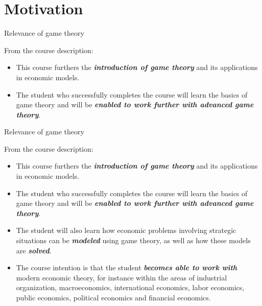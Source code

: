 \section{Motivation}

\begin{frame}{Relevance of game theory}
\begin{multicols}{2}
From the course description:
\begin{itemize}
  \item[1.] This course furthers the \textit{\textbf{introduction of game theory}} and its applications in economic models.
  \item[2.] The student who successfully completes the course will learn the basics of game theory and will be \textit{\textbf{enabled to work further with advanced game theory}}.
\end{itemize}
\vfill\null \columnbreak
\vfill\null
\end{multicols}
\end{frame}

\begin{frame}{Relevance of game theory}
\begin{multicols}{2}
\color{lightgray}
From the course description:
\begin{itemize}\color{lightgray}
  \item[\textcolor{lightgray}{1.}] This course furthers the \textit{\textbf{introduction of game theory}} and its applications in economic models.
  \item[\textcolor{lightgray}{2.}] The student who successfully completes the course will learn the basics of game theory and will be \textit{\textbf{enabled to work further with advanced game theory}}.
\end{itemize}
\vfill\null \columnbreak
\begin{itemize}
  \item[3.] The student will also learn how economic problems involving strategic situations can be \textit{\textbf{modeled}} using game theory, as well as how these models are \textit{\textbf{solved}}.
  \item[4.] The course intention is that the student \textit{\textbf{becomes able to work with}} modern economic theory, for instance within the areas of industrial organization, macroeconomics, international economics, labor economics, public economics, political economics and financial economics.
\end{itemize}
\end{multicols}
\end{frame}

